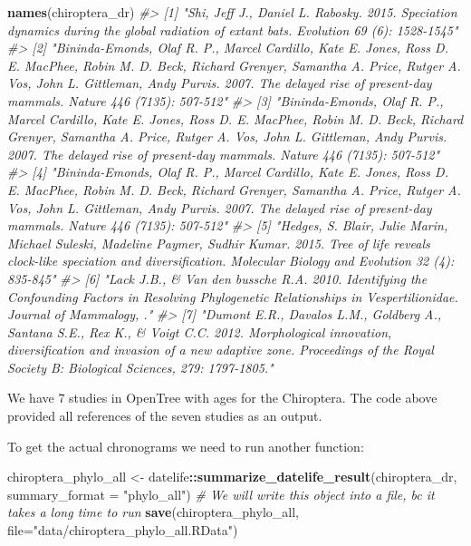 \documentclass[]{article}
\newenvironment{Shaded}{\begin{snugshade}}{\end{snugshade}}
\newcommand{\CommentTok}[1]{\textcolor[rgb]{0.56,0.35,0.01}{\textit{#1}}}
\newcommand{\DataTypeTok}[1]{\textcolor[rgb]{0.13,0.29,0.53}{#1}}
\newcommand{\KeywordTok}[1]{\textcolor[rgb]{0.13,0.29,0.53}{\textbf{#1}}}
\newcommand{\NormalTok}[1]{#1}
\newcommand{\OperatorTok}[1]{\textcolor[rgb]{0.81,0.36,0.00}{\textbf{#1}}}
\newcommand{\StringTok}[1]{\textcolor[rgb]{0.31,0.60,0.02}{#1}}
\begin{document}
\begin{Shaded}
\begin{Highlighting}[]
\KeywordTok{names}\NormalTok{(chiroptera_dr)}
\CommentTok{#> [1] "Shi, Jeff J., Daniel L. Rabosky. 2015. Speciation dynamics during the global radiation of extant bats. Evolution 69 (6): 1528-1545"                                                                                                                            }
\CommentTok{#> [2] "Bininda-Emonds, Olaf R. P., Marcel Cardillo, Kate E. Jones, Ross D. E. MacPhee, Robin M. D. Beck, Richard Grenyer, Samantha A. Price, Rutger A. Vos, John L. Gittleman, Andy Purvis. 2007. The delayed rise of present-day mammals. Nature 446 (7135): 507-512"}
\CommentTok{#> [3] "Bininda-Emonds, Olaf R. P., Marcel Cardillo, Kate E. Jones, Ross D. E. MacPhee, Robin M. D. Beck, Richard Grenyer, Samantha A. Price, Rutger A. Vos, John L. Gittleman, Andy Purvis. 2007. The delayed rise of present-day mammals. Nature 446 (7135): 507-512"}
\CommentTok{#> [4] "Bininda-Emonds, Olaf R. P., Marcel Cardillo, Kate E. Jones, Ross D. E. MacPhee, Robin M. D. Beck, Richard Grenyer, Samantha A. Price, Rutger A. Vos, John L. Gittleman, Andy Purvis. 2007. The delayed rise of present-day mammals. Nature 446 (7135): 507-512"}
\CommentTok{#> [5] "Hedges, S. Blair, Julie Marin, Michael Suleski, Madeline Paymer, Sudhir Kumar. 2015. Tree of life reveals clock-like speciation and diversification. Molecular Biology and Evolution 32 (4): 835-845"                                                          }
\CommentTok{#> [6] "Lack J.B., & Van den bussche R.A. 2010. Identifying the Confounding Factors in Resolving Phylogenetic Relationships in Vespertilionidae. Journal of Mammalogy, ."                                                                                              }
\CommentTok{#> [7] "Dumont E.R., Davalos L.M., Goldberg A., Santana S.E., Rex K., & Voigt C.C. 2012. Morphological innovation, diversification and invasion of a new adaptive zone. Proceedings of the Royal Society B: Biological Sciences, 279: 1797-1805."}
\end{Highlighting}
\end{Shaded}

We have 7 studies in OpenTree with ages for the Chiroptera. The code
above provided all references of the seven studies as an output.

To get the actual chronograms we need to run another function:

\begin{Shaded}
\begin{Highlighting}[]
\NormalTok{chiroptera_phylo_all <-}\StringTok{  }\NormalTok{datelife}\OperatorTok{::}\KeywordTok{summarize_datelife_result}\NormalTok{(chiroptera_dr, }\DataTypeTok{summary_format =} \StringTok{"phylo_all"}\NormalTok{)}
\CommentTok{# We will write this object into a file, bc it takes a long time to run}
\KeywordTok{save}\NormalTok{(chiroptera_phylo_all, }\DataTypeTok{file=}\StringTok{"data/chiroptera_phylo_all.RData"}\NormalTok{)}
\end{Highlighting}
\end{Shaded}
\end{document}
